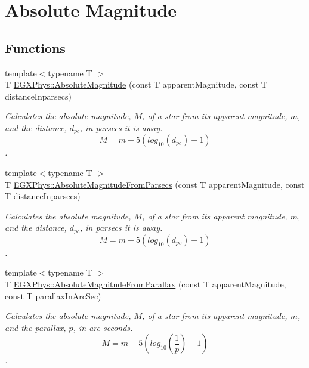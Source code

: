 \hypertarget{group___e_g_x_phys-_astrophysics-_absolute_magnitude}{}\section{Absolute Magnitude}
\label{group___e_g_x_phys-_astrophysics-_absolute_magnitude}
\subsection*{Functions}
\begin{DoxyCompactItemize}
\item 
{\footnotesize template$<$typename T $>$ }\\T \mbox{\hyperlink{group___e_g_x_phys-_astrophysics-_absolute_magnitude_ga2ddb255fa28972334d82f377ce182048}{E\+G\+X\+Phys\+::\+Absolute\+Magnitude}} (const T apparent\+Magnitude, const T distance\+Inparsecs)
\begin{DoxyCompactList}\small\item\em Calculates the absolute magnitude, $M$, of a star from its apparent magnitude, $m$, and the distance, $d_{pc}$, in parsecs it is away. \[M= m - 5 \left ( log_{10}(d_{pc}) - 1 \right )\]. \end{DoxyCompactList}\item 
{\footnotesize template$<$typename T $>$ }\\T \mbox{\hyperlink{group___e_g_x_phys-_astrophysics-_absolute_magnitude_ga6eb3d93ce8d6ff1e0cc288059225ff9a}{E\+G\+X\+Phys\+::\+Absolute\+Magnitude\+From\+Parsecs}} (const T apparent\+Magnitude, const T distance\+Inparsecs)
\begin{DoxyCompactList}\small\item\em Calculates the absolute magnitude, $M$, of a star from its apparent magnitude, $m$, and the distance, $d_{pc}$, in parsecs it is away. \[M= m - 5 \left ( log_{10}(d_{pc}) - 1 \right )\]. \end{DoxyCompactList}\item 
{\footnotesize template$<$typename T $>$ }\\T \mbox{\hyperlink{group___e_g_x_phys-_astrophysics-_absolute_magnitude_ga057faec7c22e76e31ad65bf2f98e0d58}{E\+G\+X\+Phys\+::\+Absolute\+Magnitude\+From\+Parallax}} (const T apparent\+Magnitude, const T parallax\+In\+Arc\+Sec)
\begin{DoxyCompactList}\small\item\em Calculates the absolute magnitude, $M$, of a star from its apparent magnitude, $m$, and the parallax, $p$, in arc seconds. \[M= m - 5 \left ( log_{10} \left ( \dfrac{1}{p} \right ) - 1 \right )\]. \end{DoxyCompactList}\item 

\end{DoxyCompactItemize}
